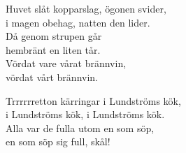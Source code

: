 \documentclass[a6paper, 10pt, twoside]{article}
\begin{document}
\newpage
\noindent
\begin{center}
\end{center}
\begin{lyrics}
Huvet slåt kopparslag, ögonen svider,\\
i magen obehag, natten den lider.\\
Då genom strupen går\\
hembränt en liten tår.\\
Vördat vare vårat brännvin,\\
vördat vårt brännvin.
\end{lyrics}
\vspace{40pt}
\begin{center}
\end{center}
\begin{lyrics}
Trrrrrretton kärringar i Lundströms kök, \\
i Lundströms kök, i Lundströms kök. \\
Alla var de fulla utom en som söp, \\
en som söp sig full, skål! 
\end{lyrics}
\end{document}
